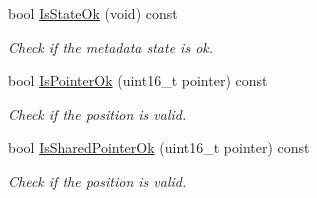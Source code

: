 \begin{DoxyCompactItemize}
$$bool \hyperlink{classns3_1_1PacketMetadata_a208d3163e28704438cdd4d30318e489c}{Is\+State\+Ok} (void) const 
\begin{DoxyCompactList}\small\item\em Check if the metadata state is ok. \end{DoxyCompactList}\item 
bool \hyperlink{classns3_1_1PacketMetadata_acf15fba7d020ebd77591619b5ad273c5}{Is\+Pointer\+Ok} (uint16\+\_\+t pointer) const 
\begin{DoxyCompactList}\small\item\em Check if the position is valid. \end{DoxyCompactList}\item 
bool \hyperlink{classns3_1_1PacketMetadata_ae62c5bb3dce611a0f8c5e9ba3ba8e26e}{Is\+Shared\+Pointer\+Ok} (uint16\+\_\+t pointer) const 
\begin{DoxyCompactList}\small\item\em Check if the position is valid. \end{DoxyCompactList}\end{DoxyCompactItemize}
